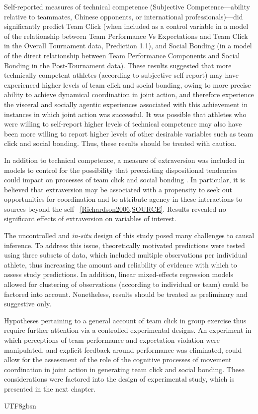 \begin{CJK}{UTF8}{gbsn}
Self-reported measures of technical competence (Subjective Competence---ability relative to teammates, Chinese opponents, or international professionals)—did significantly
predict Team Click (when included as a control variable in a model of the relationship between Team Performance Vs Expectations and Team Click in the Overall Tournament data, Prediction 1.1), and Social Bonding (in a model of the direct relationship between Team Performance Components and Social Bonding in the Post-Tournament data).  These results suggested that more technically competent athletes (according to subjective self report) may have experienced higher levels of team click and social bonding, owing to more precise ability to achieve dynamical coordination in joint action, and therefore experience the visceral and socially agentic experiences associated with this achievement in instances in which joint action was successful.  It was possible that athletes who were willing to self-report higher levels of technical competence may also have been more willing to report higher levels of other desirable variables such as team click and social bonding. Thus, these results should be treated with caution.

In addition to technical competence, a measure of extraversion was included in models to control for the possibility that preexisting dispositional tendencies could impact on processes of team click and social bonding \citep{Marsh2009,VonRueden2015}.  In particular, it is believed that extraversion may be associated with a propensity to seek out opportunities for coordination and to attribute agency in these interactions to sources beyond the self ~\ref{Richardson2006,SOURCE}.  Results revealed no significant effects of extraversion on variables of interest.

The uncontrolled and \textit{in-situ} design of this study posed many challenges to causal inference.  To address this issue, theoretically motivated predictions were tested using three subsets of data, which included multiple observations per individual athlete, thus increasing the amount and reliability of evidence with which to assess study predictions. In addition, linear mixed-effects regression models allowed for clustering of observations (according to individual or team) could be factored into account. Nonetheless, results should be treated as preliminary and suggestive only.

Hypotheses pertaining to a general account of team click in group exercise thus require further attention via a controlled experimental designs.  An experiment in which perceptions of team performance and expectation violation were manipulated, and explicit feedback around performance was eliminated, could allow for the assessment of the role of the cognitive processes of movement coordination in joint action in generating team click and social bonding.  These considerations were factored into the design of experimental study, which is presented in the next chapter.
                                                \end{CJK}{UTF8}{gbsn}
